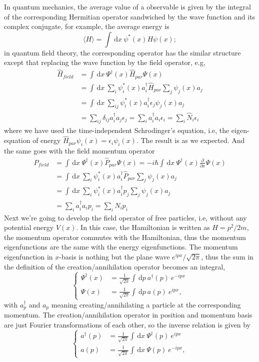 \documentclass{article}
\newcommand{\be}{\begin{equation}}
\newcommand{\ee}{\end{equation}}
\newcommand{\dif}{\,\mathrm{d}}
\newcommand{\p}{\partial}
\renewcommand{\1}{\left}
\renewcommand{\2}{\right}
\newcommand{\la}{\langle}
\newcommand{\ra}{\rangle}
\newcommand{\ep}{\epsilon}
\newcommand{\del}{\delta}
\begin{document}
In quantum mechanics, the average value of a observable is given by the integral of the corresponding Hermitian operator sandwiched by the wave function and its complex conjugate, for example, the average energy is 
\be
\la H\ra=\int \dif x\ \psi^*(x) H\psi(x);
\ee
in quantum field theory, the corresponding operator has the similar structure except that replacing the wave function by the field operator, e.g,
\be\begin{split}
\hat H_{field}&=\int\dif x\ \Psi^\dag(x) \hat H_{par}\Psi(x)\\
&=\int\dif x\ \sum_i \psi_i^*(x)a^\dag_i \hat H_{par}\sum_j \psi_j(x) a_j\\
&=\int\dif x\ \sum_{ij} \psi_i^*(x) a_i^\dag \ep_j \psi_j(x) a_j\\
&=\sum_{ij} \del_{ij}a_i^\dag a_j \ep_j=\sum_i a_i^\dag a_i \ep_i=\sum_i \hat N_i\ep_i
\end{split}\ee
where we have used the time-independent Schrodinger's equation, i.e, the eigen-equation of energy $\hat H_{par}\psi_i(x)=\ep_i\psi_i(x)$. The result is as we expected. And the same goes with the field momentum operator
\be\begin{split}
\hat P_{field}&=\int \dif x\ \Psi^\dag(x) \hat P_{par}\Psi(x)= -i\hbar \int \dif x\ \Psi^\dag(x)\frac{\p}{\p x}\Psi(x)\\
&=\int\dif x\ \sum_i \psi_i^*(x)a^\dag_i \hat P_{par}\sum_j \psi_j(x) a_j\\
&=\int\dif x\ \sum_i \psi_i^*(x)a^\dag_i p_j\sum_j \psi_j(x) a_j\\
&=\sum_i a_i^\dag a_i p_i=\sum_i N_i p_i
\end{split}\ee
Next we're going to develop the field operator of free particles, i.e, without any potential energy $V(x)$. In this case, the Hamiltonian is written as $H=p^2/{2m}$, the momentum operator commutes with the Hamiltonian, thus the momentum eigenfunctions are the same with the energy eigenfunctions. The momentum eigenfunction in $x$-basis is nothing but the plane wave $e^{ipx}/\sqrt{2\pi}$, thus the sum in the definition of the creation/annihilation operator becomes an integral,
\be\1\{\begin{split}
\Psi^\dag(x)&=\frac 1{\sqrt{2\pi}}\int\dif p\ a^\dag(p)\ e^{-ipx} \\
\Psi(x)&=\frac 1{\sqrt{2\pi}}\int\dif p\ a(p)\ e^{ipx},
\end{split}\2.\ee
with $a^\dag_p$ and $a_p$ meaning creating/annihilating a particle at the corresponding momentum. The creation/annihilation operator in position and momentum basis are just Fourier transformations of each other, so the inverse relation is given by
\be\1\{\begin{split}
a^\dag(p)&=\frac 1{\sqrt{2\pi}}\int\dif x\ \Psi^\dag(p)\ e^{ipx} \\
a(p)&=\frac 1{\sqrt{2\pi}}\int\dif x\ \Psi(p)\ e^{-ipx},
\end{split}\2.\ee\\
\end{document}
